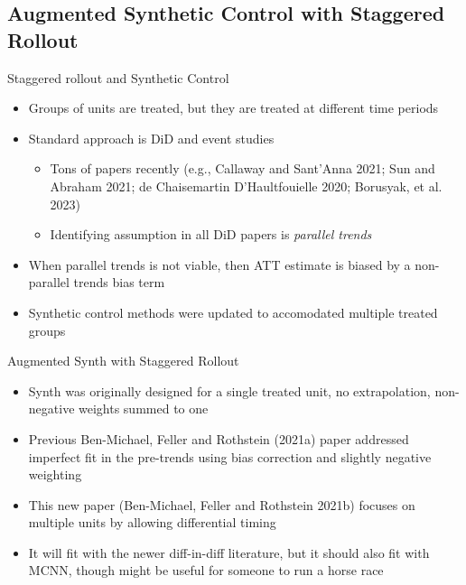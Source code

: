 \documentclass{beamer}
\begin{document}
\subsection{Augmented Synthetic Control with Staggered Rollout}

\begin{frame}{Staggered rollout and Synthetic Control}

\begin{itemize}
\item Groups of units are treated, but they are treated at different time periods
\item Standard approach is DiD and event studies
	\begin{itemize}
	\item Tons of papers recently (e.g., Callaway and Sant'Anna 2021; Sun and Abraham 2021; de Chaisemartin D'Haultfouielle 2020; Borusyak, et al. 2023)
	\item Identifying assumption in all DiD papers is \emph{parallel trends}
	\end{itemize}
\item When parallel trends is not viable, then ATT estimate is biased by a non-parallel trends bias term
\item Synthetic control methods were updated to accomodated multiple treated groups

\end{itemize}

\end{frame}


\begin{frame}{Augmented Synth with Staggered Rollout}

\begin{itemize}
\item Synth was originally designed for a single treated unit, no extrapolation, non-negative weights summed to one
\item Previous Ben-Michael, Feller and Rothstein (2021a) paper addressed imperfect fit in the pre-trends using bias correction and slightly negative weighting
\item This new paper (Ben-Michael, Feller and Rothstein 2021b) focuses on multiple units by allowing differential timing
\item It will fit with the newer diff-in-diff literature, but it should also fit with MCNN, though might be useful for someone to run a horse race
\end{itemize}

\end{frame}
\end{document}
